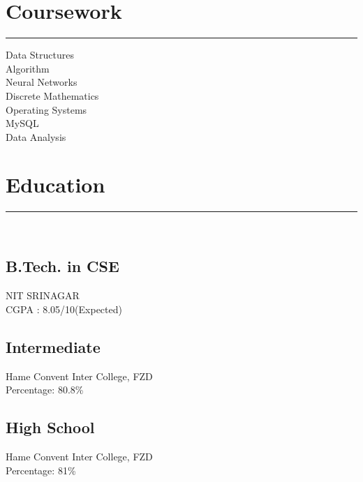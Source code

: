 \documentclass[]{neilfoxcroft-resume}
\begin{document}
\begin{minipage}[t]{0.33\textwidth}
\section{Coursework}
\noindent\rule{5cm}{0.4pt}

Data Structures\\
Algorithm\\
Neural Networks\\
Discrete Mathematics\\
Operating Systems\\
MySQL\\
Data Analysis
\sectionsep
\section{Education} 
\noindent\rule{5cm}{0.4pt}\\
\subsection{B.Tech. in CSE}
NIT SRINAGAR \\
CGPA : 8.05/10(Expected)\\
\vspace{8pt}
\subsection{Intermediate}
Hame Convent Inter College, FZD\\
Percentage: 80.8\%\\
\vspace{8pt}
\subsection{High School}
Hame Convent Inter College, FZD\\
Percentage: 81\%
\sectionsep
%
%

\end{minipage} 
\hfill
\end{document}
